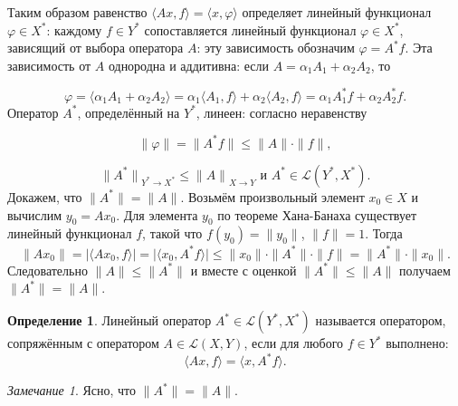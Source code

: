 \documentclass[12pt,a4paper,titlepage,oneside]{book}
\theoremstyle{definition}
\newtheorem*{definition}{Определение}
\theoremstyle{plain}
\theoremstyle{break}
\theoremstyle{remark}
\newtheorem*{remark}{Замечание}
\theoremstyle{remark}
\theoremstyle{remark}
\theoremstyle{remark}
\theoremstyle{plain}
\theoremstyle{plain}
\begin{document}
Таким образом равенство $ \langle Ax,f \rangle  =  \langle x,\varphi \rangle $ определяет линейный функционал $\varphi \in X^*$: каждому $f\in Y^*$ сопоставляется линейный функционал $\varphi\in X^*$, зависящий от выбора оператора $A$: эту зависимость обозначим $\varphi=A^* f$.
Эта зависимость от $A$ однородна и аддитивна:
если $A=\alpha_1A_1+\alpha_2A_2$, то 

$$\varphi = \langle \alpha_1A_1 + \alpha_2A_2 \rangle  = \alpha_1 \langle A_1,f \rangle + \alpha_2 \langle A_2,f \rangle  = \alpha_1A_1^*f + \alpha_2A_2^* f.$$
Оператор $A^*$, определённый на $Y^*$, линеен: согласно неравенству

$$\lVert \varphi \lVert = \lVert A^* f \lVert \leqslant \lVert A \lVert \cdot \lVert f \lVert,$$

$${\lVert A^* \lVert}_{Y^* \to X^*} \leqslant 
{\lVert A \lVert}_{X \to Y} \mbox{ и } A^* \in \mathcal{L}(Y^*,X^*).$$
Докажем, что $\lVert A^* \lVert = 
\lVert A \lVert$. Возьмём произвольный элемент $x_0 \in X$ и вычислим $y_0=Ax_0$. Для элемента $y_0$ по теореме Хана-Банаха существует линейный функционал $f$, такой что $f(y_0)= \lVert y_0 \lVert$, $\lVert f \lVert =1$. Тогда
$$\lVert Ax_0 \lVert = \vert  \langle Ax_0,f \rangle  \vert =
\vert  \langle x_0,A^*f \rangle  \vert \leqslant 
\lVert x_0 \lVert \cdot \lVert A^* \lVert
\cdot \lVert f \lVert = \lVert A^* \lVert
\cdot \lVert x_0 \lVert.$$
Следовательно $\lVert A \lVert \leqslant
\lVert A^* \lVert$ и вместе с оценкой $\lVert A^* \lVert \leqslant 
\lVert A \lVert$ получаем $\lVert A^* \lVert = 
\lVert A \lVert$.
\begin{definition}
Линейный оператор $A^* \in \mathcal{L}(Y^*,X^*)$ называется оператором, сопряжённым с оператором $A \in \mathcal{L}(X,Y)$, если для любого $f \in Y^*$ выполнено:
$$\langle Ax,f \rangle  =  \langle x,A^*f \rangle.$$
\end{definition}
\begin{remark}
Ясно, что $\lVert A^* \lVert = \lVert A \lVert$.
\end{remark}
\end{document}
